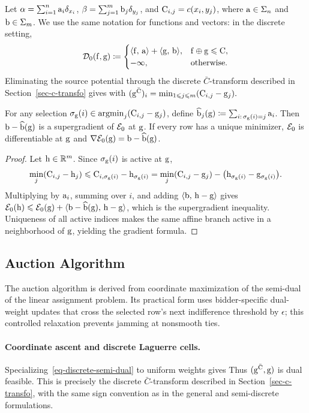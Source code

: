 Let $\alpha=\sum_{i=1}^n\mathrm{a}_i\delta_{x_i}$, $\beta=\sum_{j=1}^m\mathrm{b}_j\delta_{y_j}$, and $\mathrm{C}_{i,j}=c(x_i,y_j)$, where $\mathrm{a}\in\Sigma_n$ and $\mathrm{b}\in\Sigma_m$. We use the same notation for functions and vectors: in the discrete setting,
\[
\mathcal{D}_0(\mathrm{f},\mathrm{g})
\coloneqq
\begin{cases}
\langle \mathrm{f},\,\mathrm{a}\rangle+\langle \mathrm{g},\,\mathrm{b}\rangle,
& \mathrm{f}\oplus\mathrm{g}\leqslant\mathrm{C},\\
-\infty, & \text{otherwise}.
\end{cases}
\]
Eliminating the source potential through the discrete $\bar C$-transform described in Section~\ref{sec-c-transfo} gives
with \((\mathrm{g}^{\bar{\mathrm{C}}})_i = \min_{1\leqslant j\leqslant m}(\mathrm{C}_{i,j}-\mathrm{g}_j).\)
\begin{prop}\label{prop-discrete-semidual-supergradient}
For any selection $\sigma_{\mathrm{g}}(i)\in\operatorname{argmin}_j(\mathrm{C}_{i,j}-\mathrm{g}_j)$, define $\widehat{\mathrm{b}}_j(\mathrm{g})\coloneqq\sum_{i:\,\sigma_{\mathrm{g}}(i)=j}\mathrm{a}_i$. Then $\mathrm{b}-\widehat{\mathrm{b}}(\mathrm{g})$ is a supergradient of $\mathcal{E}_0$ at $\mathrm{g}$. If every row has a unique minimizer, $\mathcal{E}_0$ is differentiable at $\mathrm{g}$ and $\nabla\mathcal{E}_0(\mathrm{g})=\mathrm{b}-\widehat{\mathrm{b}}(\mathrm{g})$.
\end{prop}
\begin{proof}
Let $\mathrm{h}\in\mathbb{R}^m$. Since $\sigma_{\mathrm{g}}(i)$ is active at $\mathrm{g}$,
\[
\min_j(\mathrm{C}_{i,j}-\mathrm{h}_j)
\leqslant
\mathrm{C}_{i,\sigma_{\mathrm{g}}(i)}-\mathrm{h}_{\sigma_{\mathrm{g}}(i)}
=
\min_j(\mathrm{C}_{i,j}-\mathrm{g}_j)
-\bigl(\mathrm{h}_{\sigma_{\mathrm{g}}(i)}-\mathrm{g}_{\sigma_{\mathrm{g}}(i)}\bigr).
\]
Multiplying by $\mathrm{a}_i$, summing over $i$, and adding $\langle \mathrm{b},\,\mathrm{h}-\mathrm{g}\rangle$ gives $\mathcal{E}_0(\mathrm{h})\leqslant\mathcal{E}_0(\mathrm{g})+\langle \mathrm{b}-\widehat{\mathrm{b}}(\mathrm{g}),\,\mathrm{h}-\mathrm{g}\rangle$, which is the supergradient inequality. Uniqueness of all active indices makes the same affine branch active in a neighborhood of $\mathrm{g}$, yielding the gradient formula.
\end{proof}
\subsection{Auction Algorithm}
\label{sec-auction-dual-ascent}
The auction algorithm is derived from coordinate maximization of the semi-dual of the linear assignment problem. Its practical form uses bidder-specific dual-weight updates that cross the selected row's next indifference threshold by $\epsilon$; this controlled relaxation prevents jamming at nonsmooth ties.

\paragraph{Coordinate ascent and discrete Laguerre cells.}
Specializing~\eqref{eq-discrete-semi-dual} to uniform weights gives
Thus $(\mathrm{g}^{\bar{\mathrm{C}}},\mathrm{g})$ is dual feasible. This is precisely the discrete $\bar C$-transform described in Section~\ref{sec-c-transfo}, with the same sign convention as in the general and semi-discrete formulations.

